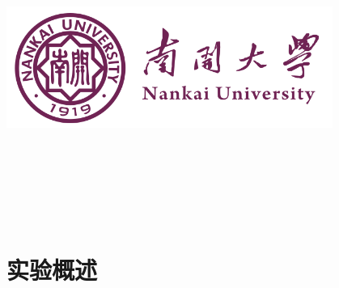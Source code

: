 \documentclass[a4paper]{article}
\newcommand{\HRule}{\rule{\linewidth}{0.5mm}}%
\begin{document}
\renewcommand{\contentsname}{目\ 录}
\renewcommand{\appendixname}{附录}
\renewcommand{\appendixpagename}{附录}
\renewcommand{\refname}{参考文献} 
\renewcommand{\figurename}{图}
\renewcommand{\tablename}{表}
\renewcommand{\today}{\number\year 年 \number\month 月 \number\day 日}

\begin{titlepage}
    \begin{center}
    \includegraphics[width=0.8\textwidth]{NKU.png}\\[1cm]
    \vspace{20mm}
		\textbf{\huge\textbf{}}\\[0.5cm]
		\textbf{\huge{}}\\[2.3cm]
		\textbf{\Huge\textbf{}}

		\vspace{\fill}
    
    \centering
    \textsc{\LARGE {}}\\[0.5cm]
    \textsc{\LARGE {}}\\[0.5cm]
    \textsc{\LARGE {}}\\[0.5cm]
    
    \vfill
    {\Large }
    \end{center}
\end{titlepage}

\renewcommand {\thefigure}{\thesection{}.\arabic{figure}}%
\renewcommand{\figurename}{图}
\renewcommand{\contentsname}{目录}  


\clearpage
\tableofcontents
\newpage

\section{实验概述}
\end{document}
